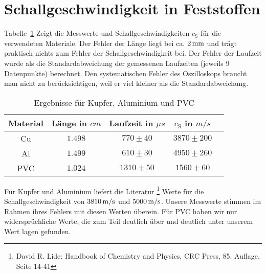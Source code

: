 \section{Schallgeschwindigkeit in Feststoffen}
Tabelle~\ref{tb:res} Zeigt die Messwerte und Schallgeschwindigkeiten $c_\mathrm{S}$ für die verwendeten Materiale. Der Fehler der Länge liegt bei ca. $\unit[2]{mm}$ und trägt praktisch nichts zum Fehler der Schallgeschwindigkeit bei. 
Der Fehler der Laufzeit wurde als die Standardabweichung der gemessenen Laufzeiten (jeweils 9 Datenpunkte) berechnet. Den systematischen Fehler des Oszilloskops braucht man nicht zu berücksichtigen, weil er viel kleiner als die Standardabweichung.

\begin{table}
    \centering
\begin{tabular}[h]{c c c c c }
    Material & Länge in $\unit{cm}$ & Laufzeit in $\unit{\mu s}$ & $c_\mathrm{S}$ in $\unit{m/s}$ \\\hline
    Cu & $1.498$ & $770 \pm 40$ & $3870 \pm 200$ \\
    Al & $1.499$ & $610 \pm 30$ & $4950 \pm 260$ \\
    PVC & $1.024$ & $1310 \pm 50$ & $1560 \pm 60$ \\
\end{tabular}
\caption{Ergebnisse für Kupfer, Aluminium und PVC}
\label{tb:res}
\end{table}

Für Kupfer und Aluminium liefert die Literatur%
\footnote{David R. Lide: Handbook of Chemistry and Physics, CRC Press, 85. Auflage, Seite 14-41}
Werte für die Schallgeschwindigkeit von $\unit[3810]{m/s}$ und $\unit[5000]{m/s}$. Unsere Messwerte stimmen im Rahmen ihres  Fehlers mit diesen Werten überein. Für PVC haben wir nur widersprüchliche Werte, die zum Teil deutlich über und deutlich unter unserem Wert lagen gefunden.

